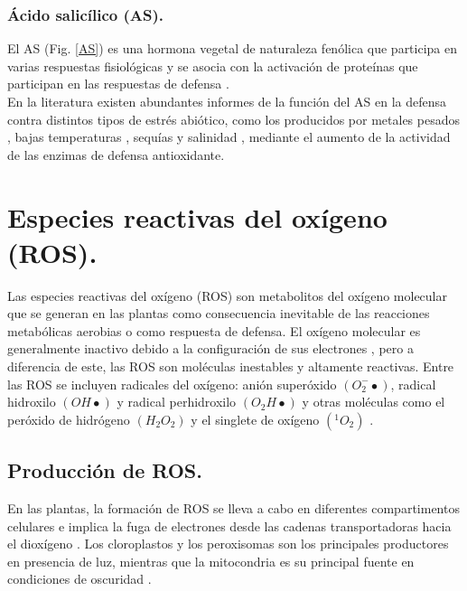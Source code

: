 \subsubsection{\'Acido salic\'ilico (AS).} 

El AS (Fig. \ref{AS}) es una hormona vegetal de naturaleza fen\'olica que participa en varias respuestas fisiol\'ogicas \citep{raskin1992salicylate} y se asocia con la activaci\'on de prote\'inas que participan en las respuestas de defensa \citep{glazebrook2005contrasting}.\\

En la literatura existen abundantes informes de la funci\'on del AS en la defensa contra distintos tipos de estr\'es abi\'otico, como los producidos por metales pesados \citep{alyemeni2014effect}, bajas temperaturas \citep{mutlu2013protective}, sequ\'ias \citep{alam2013exogenous} y salinidad \citep{fayez2014improving}, mediante el aumento de la actividad de las enzimas de defensa antioxidante. \\

\section{Especies reactivas del ox\'igeno (ROS).}

Las especies reactivas del ox\'igeno (ROS) son metabolitos del ox\'igeno molecular \citep{pandey2014oxidative}  que se generan en las plantas como consecuencia inevitable de las reacciones metab\'olicas aerobias \citep{buchanan2015biochemistry} o como respuesta de defensa. El ox\'igeno molecular es generalmente inactivo debido a la configuraci\'on de sus electrones \citep{elstner1987metabolism}, pero a diferencia de este, las ROS son mol\'eculas inestables y altamente reactivas. Entre las ROS se incluyen radicales del ox\'igeno: ani\'on super\'oxido $(O_{2}^{-} \bullet)$, radical hidroxilo $(OH\bullet)$ y radical perhidroxilo $(O_2H\bullet)$ y otras moléculas como el peróxido de hidrógeno $(H_2O_2)$ y el singlete de oxígeno $(^1O_2)$ \citep{buchanan2015biochemistry}.

\subsection{Producci\'on de ROS.}

En las plantas, la formaci\'on de ROS se lleva a cabo en diferentes compartimentos celulares \citep{apel2004reactive} e implica la fuga de electrones desde las cadenas transportadoras hacia el diox\'igeno \citep{corpas2015production}. Los cloroplastos y los peroxisomas son los principales productores en presencia de luz, mientras que la mitocondria es su principal fuente en condiciones de oscuridad \citep{choudhury2013reactive}. \\

